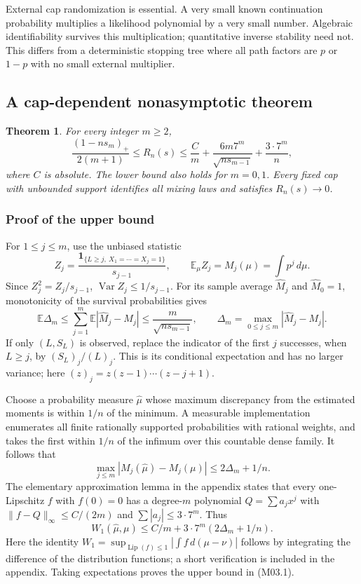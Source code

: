 \documentclass[11pt,a4paper]{article}
\newtheorem{theorem}{Theorem}[section]
\theoremstyle{definition}\newtheorem{definition}[theorem]{Definition}
\theoremstyle{remark}\newtheorem{remark}[theorem]{Remark}
\newcommand{\E}{\mathbb E}\newcommand{\one}{\mathbf 1}\newcommand{\1}{\mathbf 1}
\DeclareMathOperator{\Lip}{Lip}\DeclareMathOperator{\Var}{Var}
\numberwithin{equation}{section}
\begin{document}
External cap randomization is essential. A very small known continuation probability multiplies a likelihood polynomial by a very small number. Algebraic identifiability survives this multiplication; quantitative inverse stability need not. This differs from a deterministic stopping tree where all path factors are $p$ or $1-p$ with no small external multiplier.

\subsection{A cap-dependent nonasymptotic theorem}\label{M03-sec-2}
\begin{theorem}\label{M03-th:bounds}
For every integer $m\ge2$,
\[
 \frac{(1-ns_m)_+}{2(m+1)}\le R_n(s)
 \le\frac{C}{m}+\frac{6m7^m}{\sqrt{n s_{m-1}}}
                  +\frac{3\cdot7^m}{n},\tag{M03.1}
\]
where $C$ is absolute. The lower bound also holds for $m=0,1$.
Every fixed cap with unbounded support identifies all mixing laws and satisfies $R_n(s)\to0$.
\end{theorem}

\subsubsection{Proof of the upper bound}
For $1\le j\le m$, use the unbiased statistic
\[
 Z_j=\frac{\1_{\{L\ge j,\ X_1=\cdots=X_j=1\}}}{s_{j-1}},
 \qquad \E_\mu Z_j=M_j(\mu)=\int p^j\,d\mu.
\]
Since $Z_j^2=Z_j/s_{j-1}$, $\Var Z_j\le1/s_{j-1}$. For its sample average $\widehat M_j$ and $\widehat M_0=1$, monotonicity of the survival probabilities gives
\[
 \E\Delta_m\le\sum_{j=1}^m\E|\widehat M_j-M_j|
 \le\frac{m}{\sqrt{ns_{m-1}}},\qquad
 \Delta_m=\max_{0\le j\le m}|\widehat M_j-M_j|.\tag{M03.2}
\]
If only $(L,S_L)$ is observed, replace the indicator of the first $j$ successes, when $L\ge j$, by $(S_L)_j/(L)_j$. This is its conditional expectation and has no larger variance; here $(z)_j=z(z-1)\cdots(z-j+1)$.

Choose a probability measure $\widehat\mu$ whose maximum discrepancy from the estimated moments is within $1/n$ of the minimum. A measurable implementation enumerates all finite rationally supported probabilities with rational weights, and takes the first within $1/n$ of the infimum over this countable dense family. It follows that
\[
 \max_{j\le m}|M_j(\widehat\mu)-M_j(\mu)|\le2\Delta_m+1/n.\tag{M03.3}
\]
The elementary approximation lemma in the appendix states that every one-Lipschitz $f$ with $f(0)=0$ has a degree-$m$ polynomial $Q=\sum a_jx^j$ with $\|f-Q\|_\infty\le C/(2m)$ and $\sum|a_j|\le3\cdot7^m$. Thus
\[
 W_1(\widehat\mu,\mu)\le C/m+3\cdot7^m(2\Delta_m+1/n).
\]
Here the identity $W_1=\sup_{\Lip(f)\le1}|\int f\,d(\mu-\nu)|$ follows by integrating the difference of the distribution functions; a short verification is included in the appendix. Taking expectations proves the upper bound in (M03.1).
\end{document}
